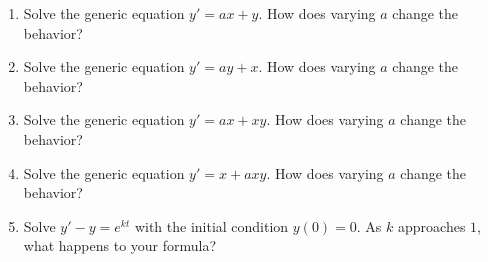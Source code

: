 \documentclass{exercises}
\begin{document}
\begin{enumerate}[resume]
\item Solve the generic equation $y'=ax+y$. How does varying $a$ change the behavior?
\item Solve the generic equation $y'=ay+x$. How does varying $a$ change the behavior?
\item Solve the generic equation $y'=ax+xy$. How does varying $a$ change the behavior?
\item Solve the generic equation $y'=x+axy$. How does varying $a$ change the behavior?
\item Solve $y'-y=e^{kt}$ with the initial condition $y(0)=0$. As $k$ approaches $1$, what happens to your formula?
\end{enumerate}
\end{document}
